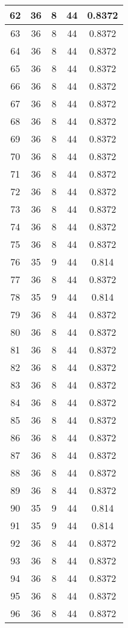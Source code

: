 \documentclass[letterpaper, 12pt]{article}
\begin{document}
\begin{longtable}{|c|c|c|c|c|}
\hline
62 & 36 & 8 & 44 & 0.8372 \\
\hline
63 & 36 & 8 & 44 & 0.8372 \\
\hline
64 & 36 & 8 & 44 & 0.8372 \\
\hline
65 & 36 & 8 & 44 & 0.8372 \\
\hline
66 & 36 & 8 & 44 & 0.8372 \\
\hline
67 & 36 & 8 & 44 & 0.8372 \\
\hline
68 & 36 & 8 & 44 & 0.8372 \\
\hline
69 & 36 & 8 & 44 & 0.8372 \\
\hline
70 & 36 & 8 & 44 & 0.8372 \\
\hline
71 & 36 & 8 & 44 & 0.8372 \\
\hline
72 & 36 & 8 & 44 & 0.8372 \\
\hline
73 & 36 & 8 & 44 & 0.8372 \\
\hline
74 & 36 & 8 & 44 & 0.8372 \\
\hline
75 & 36 & 8 & 44 & 0.8372 \\
\hline
76 & 35 & 9 & 44 & 0.814 \\
\hline
77 & 36 & 8 & 44 & 0.8372 \\
\hline
78 & 35 & 9 & 44 & 0.814 \\
\hline
79 & 36 & 8 & 44 & 0.8372 \\
\hline
80 & 36 & 8 & 44 & 0.8372 \\
\hline
81 & 36 & 8 & 44 & 0.8372 \\
\hline
82 & 36 & 8 & 44 & 0.8372 \\
\hline
83 & 36 & 8 & 44 & 0.8372 \\
\hline
84 & 36 & 8 & 44 & 0.8372 \\
\hline
85 & 36 & 8 & 44 & 0.8372 \\
\hline
86 & 36 & 8 & 44 & 0.8372 \\
\hline
87 & 36 & 8 & 44 & 0.8372 \\
\hline
88 & 36 & 8 & 44 & 0.8372 \\
\hline
89 & 36 & 8 & 44 & 0.8372 \\
\hline
90 & 35 & 9 & 44 & 0.814 \\
\hline
91 & 35 & 9 & 44 & 0.814 \\
\hline
92 & 36 & 8 & 44 & 0.8372 \\
\hline
93 & 36 & 8 & 44 & 0.8372 \\
\hline
94 & 36 & 8 & 44 & 0.8372 \\
\hline
95 & 36 & 8 & 44 & 0.8372 \\
\hline
96 & 36 & 8 & 44 & 0.8372 \\

\end{longtable}
\end{document}
